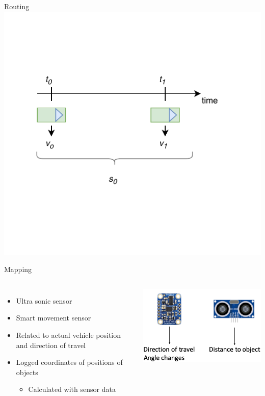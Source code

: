 \documentclass{beamer}
\begin{document}
\begin{frame}{Routing}
\centering
\includegraphics[page=3,scale=0.8]{sources/Rounting_1.pdf}
\end{frame}

\begin{frame}{Mapping}
\begin{columns}
\begin{itemize}
\item Ultra sonic sensor
\item Smart movement sensor
\item Related to actual vehicle position and direction of travel
\item Logged coordinates of positions of objects
	\begin{itemize}
	\item Calculated with sensor data
	\end{itemize}
\end{itemize}
\includegraphics[scale=0.4]{sources/manu_7.png}
\end{columns}
\end{frame}
\end{document}
